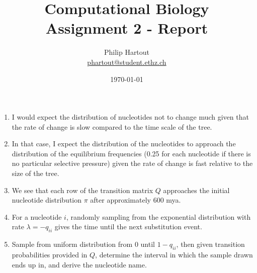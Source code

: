 \documentclass[a4paper,10pt,twoside]{article}
\title{Computational Biology \\ Assignment 2 - Report}
\author{Philip Hartout \\ \url{phartout@student.ethz.ch}}
\date{\today}
\begin{document}
\maketitle

\begin{enumerate}
    \item  I would expect the distribution of nucleotides not to change much given that the rate of change is slow compared to the time scale of the tree. 
    \item  In that case, I expect the distribution of the nucleotides to approach the distribution of the equilibrium frequencies (0.25 for each nucleotide if there is no particular selective pressure) given the rate of change is fast relative to the size of the tree.
    \item  We see that each row of the transition matrix $Q$ approaches the initial nucleotide distribution $\pi$ after approximately 600 mya. 
    \item  For a nucleotide $i$, randomly sampling from the exponential distribution with rate $\lambda = -q_{ii}$ gives the time until the next substitution event.
    \item  Sample from uniform distribution from $0$ until $1-q_{ii}$, then given transition probabilities provided in $Q$, determine the interval in which the sample drawn ends up in, and derive the nucleotide name. 
\end{enumerate}
\end{document}
